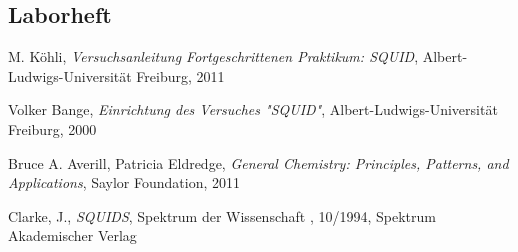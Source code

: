\documentclass[12pt]{article}
\begin{document}
\subsection{Laborheft}
\label{Laborbuch}
\newpage
\listoffigures


\newpage
\thispagestyle{empty}
\begin{thebibliography}{9}

  

  
  

M. Köhli,
\emph{Versuchsanleitung Fortgeschrittenen Praktikum: SQUID},
Albert-Ludwigs-Universität Freiburg,
2011

Volker Bange,
\emph{Einrichtung des Versuches "SQUID"},
Albert-Ludwigs-Universität Freiburg,
2000

Bruce A. Averill, Patricia Eldredge,
\emph{General Chemistry: Principles, Patterns, and Applications},
Saylor Foundation,
2011

Clarke, J.,
\emph{SQUIDS},
Spektrum der Wissenschaft , 10/1994,
Spektrum Akademischer Verlag
\end{thebibliography}
\end{document}
